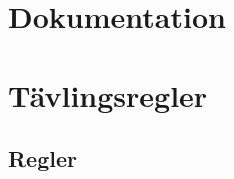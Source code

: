 \documentclass[a4paper,12pt]{article}
\begin{document}
\section{Dokumentation}



\newpage
\appendix
\section{Tävlingsregler} \label{app:rules}
%
%

\subsection{Regler}
\end{document}
